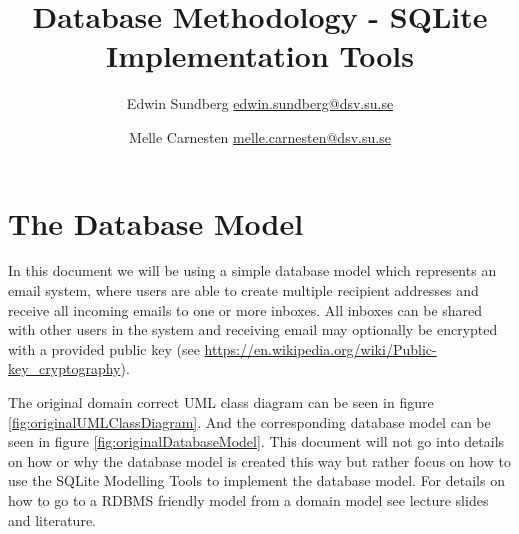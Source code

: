 \documentclass[a4paper,11pt,oneside]{article}
\title{Database Methodology - SQLite Implementation Tools}
\author{Edwin Sundberg \url{edwin.sundberg@dsv.su.se}\and Melle Carnesten \url{melle.carnesten@dsv.su.se}}
\begin{document}
\maketitle \pagebreak

\begin{sloppypar}  

\tableofcontents \pagebreak




\section{The Database Model}
\label{exampleDatabaseModel}
In this document we will be using a simple database model which represents an email system, where users are able to create multiple recipient addresses and receive all incoming emails to one or more inboxes. All inboxes can be shared with other users in the system and receiving email may optionally be encrypted with a provided public key (see \url{https://en.wikipedia.org/wiki/Public-key_cryptography}). 

The original domain correct UML class diagram can be seen in figure \autoref{fig:originalUMLClassDiagram}. And the corresponding database model can be seen in figure \autoref{fig:originalDatabaseModel}. This document will not go into details on how or why the database model is created this way but rather focus on how to use the SQLite Modelling Tools to implement the database model. For details on how to go to a RDBMS friendly model from a domain model see lecture slides and literature.


\end{sloppypar}
\end{document}
